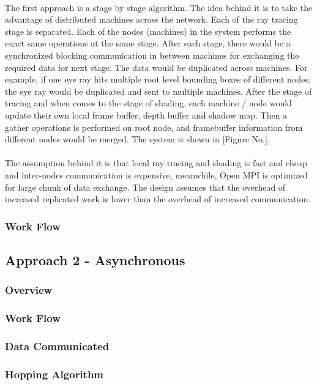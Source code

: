 \documentclass[a4paper, oneside, 10pt]{article}
\begin{document}
\paragraph{}The first approach is a stage by stage algorithm. The idea behind it is to take the advantage of distributed machines across the network. Each of the ray tracing stage is separated. Each of the nodes (machines) in the system performs the exact same operations at the same stage. After each stage, there would be a synchronized blocking communication in between machines for exchanging the required data for next stage. The data would be duplicated across machines. For example, if one eye ray hits multiple root level bounding boxes of different nodes, the eye ray would be duplicated and sent to multiple machines. 
After the stage of tracing and when comes to the stage of shading, each machine / node would update their own local frame buffer, depth buffer and shadow map. Then a gather operations is performed on root node, and framebuffer information from different nodes would be merged.
The system is shown in [Figure No.].
\paragraph{}The assumption behind it is that local ray tracing and shading is fast and cheap and inter-nodes communication is expensive, meanwhile, Open MPI is optimized for large chunk of data exchange. The design assumes that the overhead of increased replicated work is lower than the overhead of increased communication.
\subsubsection{Work Flow}
\subsection{Approach 2 - Asynchronous}
\subsubsection{Overview}
\subsubsection{Work Flow}
\subsubsection{Data Communicated}
\subsubsection{Hopping Algorithm}
\end{document}
